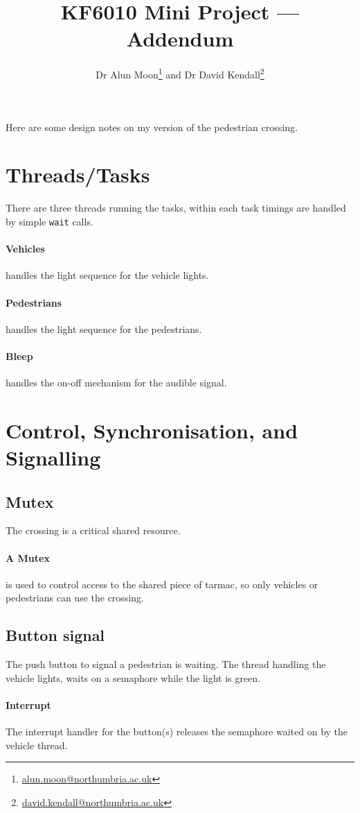 \documentclass[12pt]{article}
\title{KF6010 Mini Project --- Addendum}
\author{Dr Alun Moon\thanks{\url{alun.moon@northumbria.ac.uk}} and
Dr David Kendall\thanks{\url{david.kendall@northumbria.ac.uk}}}
\begin{document}
\maketitle
\appendix
\begin{appendix}
	Here are some design notes on my version of the pedestrian crossing.
\end{appendix}
\section{Threads/Tasks}
There are three threads running the tasks, within each task timings are handled
by simple \texttt{wait} calls. 
\paragraph{Vehicles} handles the light sequence for the vehicle lights.
\paragraph{Pedestrians} handles the light sequence for the pedestrians.
\paragraph{Bleep} handles the on-off mechanism for the audible signal.

\section{Control, Synchronisation, and Signalling}
\subsection{Mutex}
The crossing is a critical shared resource.
\paragraph{A Mutex} is used to control access to the shared piece of tarmac,
so only vehicles or pedestrians can use the crossing.

\subsection{Button signal}
The push button to signal a pedestrian is waiting.  
The thread handling the vehicle lights, waits on a semaphore while the light  is green.
\paragraph{Interrupt}  The interrupt handler for the button(s) releases the
semaphore waited on by the vehicle thread.
\end{document}
